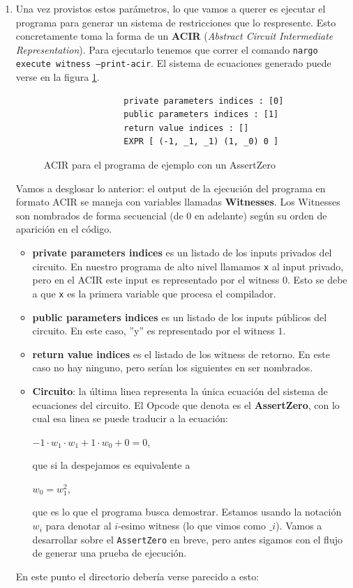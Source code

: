 \documentclass[11pt,a4paper]{tesis}
\begin{document}
\begin{enumerate}[start=3]
	
	
	
	\item Una vez provistos estos parámetros, lo que vamos a querer es ejecutar el programa para generar un sistema de restricciones que lo respresente. Esto concretamente toma la forma de un \textbf{ACIR} (\textit{Abstract Circuit Intermediate Representation}). Para ejecutarlo tenemos que correr el comando \texttt{nargo execute witness --print-acir}. El sistema de ecuaciones generado puede verse en la figura \ref{fig:ACIR_ejemplo_1}.
	
	\begin{figure} 
		\centering
		\begin{minipage}{0.7\textwidth}
			\begin{verbatim}
				private parameters indices : [0]
				public parameters indices : [1]
				return value indices : []
				EXPR [ (-1, _1, _1) (1, _0) 0 ]
			\end{verbatim}
		\end{minipage}
		
		\caption{ACIR para el programa de ejemplo con un AssertZero}
		\label{fig:ACIR_ejemplo_1}
	\end{figure}
	
	Vamos a desglosar lo anterior: el output de la ejecución del programa en formato ACIR se maneja con variables llamadas \textbf{Witnesses}. Los Witnesses son nombrados de forma secuencial (de 0 en adelante) según su orden de aparición en el código. 
	\begin{itemize}
		\item \textbf{private parameters indices} es un listado de los inputs privados del circuito. En nuestro programa de alto nivel llamamos \texttt{x} al input privado, pero en el ACIR este input es representado por el witness $0$. Esto se debe a que \texttt{x} es la primera variable que procesa el compilador.  
		\item \textbf{public parameters indices} es un listado de los inputs públicos del circuito. En este caso, ''y'' es representado por el witness $1$. 
		\item \textbf{return value indices} es el listado de los witness de retorno. En este caso no hay ninguno, pero serían los siguientes en ser nombrados.
		\item \textbf{Circuito}: la última linea representa la única ecuación del sistema de ecuaciones del circuito. El Opcode que denota es el \textbf{AssertZero}, con lo cual esa linea se puede traducir a la ecuación:
		
		\begin{center}
			$-1 \cdot w_1 \cdot w_1 + 1 \cdot w_0 + 0 = 0$, 
		\end{center}
		que si la despejamos es equivalente a 
		\begin{center}
			$w_0 = w_1^2$,
		\end{center}
		que es lo que el programa busca demostrar. Estamos usando la notación $w_i$ para denotar al $i$-esimo witness (lo que vimos como $\_i$). Vamos a desarrollar sobre el \texttt{AssertZero} en breve, pero antes sigamos con el flujo de generar una prueba de ejecución. 
	\end{itemize}
	En este punto el directorio debería verse parecido a esto:
	

\end{enumerate}
\end{document}
